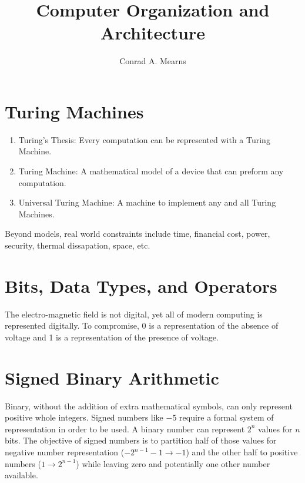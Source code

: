 \documentclass{article}
\title{Computer Organization and Architecture}
\author{Conrad A. Mearns}
\begin{document}
\maketitle

\section{Turing Machines}
\begin{enumerate}
  \item {Turing's Thesis: Every computation can be represented with a Turing Machine.}
  \item {Turing Machine: A mathematical model of a device that can preform any computation.}
  \item {Universal Turing Machine: A machine to implement any and all Turing Machines.}
\end{enumerate}

Beyond models, real world constraints include time, financial cost, power, security, thermal dissapation, space, etc.\\

\section{Bits, Data Types, and Operators}
The electro-magnetic field is not digital, yet all of modern computing is represented digitally. To compromise, 0 is a representation of the absence of voltage and 1 is a representation of the presence of voltage.

\centering
{}
\raggedright

\section{Signed Binary Arithmetic}
Binary, without the addition of extra mathematical symbols, can only represent positive whole integers. Signed numbers like $-5$ require a formal system of representation in order to be used. A binary number can represent $2^n$ values for $n$ bits. The objective of signed numbers is to partition half of those values for negative number representation ($-2^{n-1}-1 \to -1$) and the other half to positive numbers ($1 \to 2^{n-1}$) while leaving zero and potentially one other number available.
\end{document}

